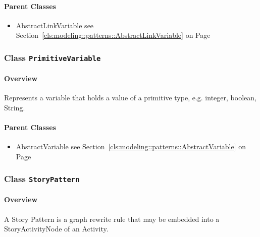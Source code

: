 	



\paragraph{Parent Classes}
\begin{itemize}
\item AbstractLinkVariable see Section~\ref{cls:modeling::patterns::AbstractLinkVariable} on Page~\pageref{cls:modeling::patterns::AbstractLinkVariable}\end{itemize}
\subsubsection{\Large{Class \bfseries \texttt{PrimitiveVariable}\normalfont}}
\label{cls:modeling::patterns::PrimitiveVariable} 
\paragraph{Overview}

	
			
Represents a variable that holds a value of a primitive type, e.g. integer, boolean, String.	
		
	



\paragraph{Parent Classes}
\begin{itemize}
\item AbstractVariable see Section~\ref{cls:modeling::patterns::AbstractVariable} on Page~\pageref{cls:modeling::patterns::AbstractVariable}\end{itemize}
\subsubsection{\Large{Class \bfseries \texttt{StoryPattern}\normalfont}}
\label{cls:modeling::patterns::StoryPattern} 
\paragraph{Overview}

	
			
A Story Pattern is a graph rewrite rule that may be embedded into a StoryActivityNode
of an Activity.	
		
	


